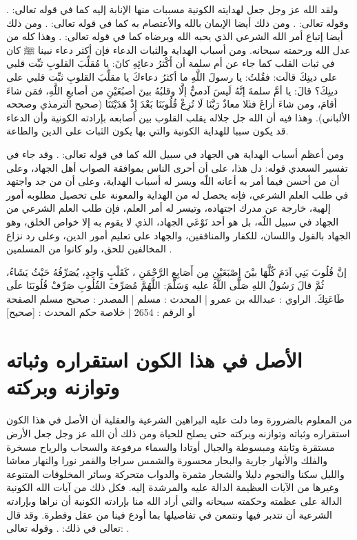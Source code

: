 ولقد الله عز وجل جعل لهدايته الكونية مسببات منها الإنابة إليه كما في قوله تعالى:
\quranayah*[42][13][30]{\footnotesize \surahname*[42]}. وقوله تعالى:
\quranayah*[13][27]{\footnotesize \surahname*[13]}.
ومن ذلك أيضا الإيمان بالله والأعتصام به كما في قوله تعالى:
\quranayah*[4][175]{\footnotesize \surahname*[4]}. ومن ذلك أيضا إتباع أمر الله الشرعي الذي يحبه الله ويرضاه كما في قوله تعالى:
\quranayah*[5][16]{\footnotesize \surahname*[5]}.  وهذا كله من عدل الله ورحمته سبحانه. ومن أسباب الهداية والثبات الدعاء فإن أكثر دعاء نبينا ﷺ كان في ثبات القلب كما جاء عن أم سلمة أن أَكْثرُ دعائِهِ كانَ: يا مُقلِّبَ القلوبِ ثبِّت قلبي على دينِكَ قالَت: فقُلتُ: يا رسولَ اللَّهِ ما أكثرُ دعاءكَ يا مقلِّبَ القلوبِ ثبِّت قلبي على دينِكَ؟ قالَ: يا أمَّ سلمةَ إنَّهُ لَيسَ آدميٌّ إلَّا وقلبُهُ بينَ أصبُعَيْنِ من أصابعِ اللَّهِ، فمَن شاءَ أقامَ، ومن شاءَ أزاغَ \.فتلا معاذٌ رَبَّنَا لَا تُزِغْ قُلُوبَنَا بَعْدَ إِذْ هَدَيْتَنَا {\footnotesize (صحيح الترمذي وصححه الألباني)}. وهذا فيه أن الله جل جلاله يقلب القلوب بين أصابعه بإرادته الكونية وأن الدعاء قد يكون سببا للهداية الكونية والتي بها يكون الثبات على الدين والطاعة.  

ومن أعظم أسباب الهداية هي الجهاد في سبيل الله كما في قوله تعالى:  \quranayah*[29][69]{\footnotesize \surahname*[29]}. وقد جاء في تفسير السعدي قوله: دل هذا، على أن أحرى الناس بموافقة الصواب أهل الجهاد، وعلى أن من أحسن فيما أمر به أعانه اللّه ويسر له أسباب الهداية، وعلى أن من جد واجتهد في طلب العلم الشرعي، فإنه يحصل له من الهداية والمعونة على تحصيل مطلوبه أمور إلهية، خارجة عن مدرك اجتهاده، وتيسر له أمر العلم، فإن طلب العلم الشرعي من الجهاد في سبيل اللّه، بل هو أحد نَوْعَي الجهاد، الذي لا يقوم به إلا خواص الخلق، وهو الجهاد بالقول واللسان، للكفار والمنافقين، والجهاد على تعليم أمور الدين، وعلى رد نزاع المخالفين للحق، ولو كانوا من المسلمين \cite{tafsir_Saadi}.

إنَّ قُلُوبَ بَنِي آدَمَ كُلَّهَا بيْنَ إِصْبَعَيْنِ مِن أَصَابِعِ الرَّحْمَنِ ، كَقَلْبٍ وَاحِدٍ، يُصَرِّفُهُ حَيْثُ يَشَاءُ، ثُمَّ قالَ رَسُولُ اللهِ صَلَّى اللَّهُ عليه وَسَلَّمَ: اللَّهُمَّ مُصَرِّفَ القُلُوبِ صَرِّفْ قُلُوبَنَا علَى طَاعَتِكَ.
الراوي : عبدالله بن عمرو | المحدث : مسلم | المصدر : صحيح مسلم
الصفحة أو الرقم : 2654 | خلاصة حكم المحدث : [صحيح]

\section{الأصل في هذا الكون استقراره وثباته وتوازنه وبركته}

من المعلوم بالضرورة وما دلت عليه البراهين الشرعية والعقلية أن الأصل في هذا الكون استقراره وثباته وتوازنه وبركته حتى يصلح للحياة ومن ذلك أن الله عز وجل جعل الأرض مستقرة وثابتة ومبسوطة والجبال أوتادا والسماء مرفوعة والسحاب والرياح مسخرة والفلك والأنهار جارية والبحار محسورة والشمس سراجا والقمر نورا والنهار معاشا والليل سكنا والنجوم دليلا والشجار مثمرة والدواب متحركة وسائر المخلوقات المتنوعة وغيرها من الآيات العظيمة الدالة عليه والمرشدة إليه. فكل ذلك من آيات الله الكونية الدالة على عظمته وحكمته سبحانه والتي أراد الله منا بإرادته الكونية أن نراها وبإرادته الشرعية أن نتدبر فيها ونتمعن في تفاصيلها بما أودع فينا من عقل وفطرة. وقد قال تعالى في ذلك: 
\quranayah*[27][93]{\footnotesize \surahname*[27]}. وقوله تعالى:
\quranayah*[41][53]{\footnotesize \surahname*[41]}.

